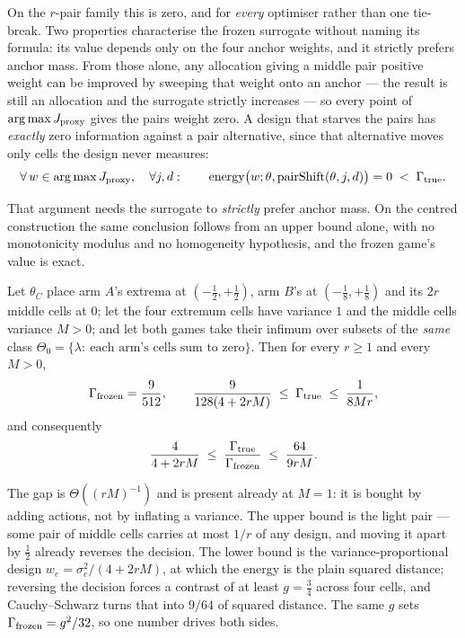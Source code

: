 On the $r$-pair family this is zero, and for \emph{every} optimiser rather than one
tie-break. Two properties characterise the frozen surrogate without naming its formula:
its value depends only on the four anchor weights, and it strictly prefers anchor mass.
From those alone, any allocation giving a middle pair positive weight can be improved by
sweeping that weight onto an anchor --- the result is still an allocation and the
surrogate strictly increases --- so every point of $\arg\max J_{\rm proxy}$ gives the
pairs weight zero. A design that starves the pairs has \emph{exactly} zero information
against a pair alternative, since that alternative moves only cells the design never
measures:
\[
\forall\,w\in\arg\max J_{\rm proxy},\quad\forall j,d:\qquad
\mathrm{energy}\bigl(w;\theta,\mathrm{pairShift}(\theta,j,d)\bigr)=0
\;<\;\Gamma_{\rm true}.
\]


That argument needs the surrogate to \emph{strictly} prefer anchor mass. On the centred
construction the same conclusion follows from an upper bound alone, with no monotonicity
modulus and no homogeneity hypothesis, and the frozen game's value is exact.

\begin{theorem}
\label{thm:sepcentred}
Let $\theta_{C}$ place arm $A$'s extrema at $(-\tfrac12,+\tfrac12)$, arm $B$'s at
$(-\tfrac18,+\tfrac18)$ and its $2r$ middle cells at $0$; let the four extremum cells have
variance $1$ and the middle cells variance $M>0$; and let both games take their infimum over
subsets of the \emph{same} class
$\Theta_{0}=\{\lambda:\ \text{each arm's cells sum to zero}\}$. Then for every $r\ge1$
and every $M>0$,
\[
\Gamma_{\rm frozen}=\frac{9}{512},
\qquad
\frac{9}{128(4+2rM)}\;\le\;\Gamma_{\rm true}\;\le\;\frac{1}{8Mr},
\]
and consequently
\[
\frac{4}{4+2rM}
\;\le\;
\frac{\Gamma_{\rm true}}{\Gamma_{\rm frozen}}
\;\le\;
\frac{64}{9rM} .
\]
\end{theorem}

The gap is $\Theta((rM)^{-1})$ and is present already at $M=1$: it is bought by adding
actions, not by inflating a variance. The upper bound is the light pair --- some pair of
middle cells carries at most $1/r$ of any design, and moving it apart by $\tfrac12$ already
reverses the decision. The lower bound is the variance-proportional design
$w_{e}=\sigma_{e}^{2}/(4+2rM)$, at which the energy is the plain squared distance; reversing
the decision forces a contrast of at least $g=\tfrac34$ across four cells, and
Cauchy--Schwarz turns that into $9/64$ of squared distance. The same $g$ sets
$\Gamma_{\rm frozen}=g^{2}/32$, so one number drives both sides.

